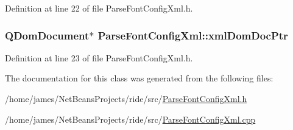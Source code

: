 Definition at line 22 of file Parse\-Font\-Config\-Xml.\-h.

\hypertarget{class_parse_font_config_xml_ac1f584710fc22d628bdca0e71308bffe}{
\subsubsection[{xml\-Dom\-Doc\-Ptr}]{\setlength{\rightskip}{0pt plus 5cm}Q\-Dom\-Document$\ast$ Parse\-Font\-Config\-Xml\-::xml\-Dom\-Doc\-Ptr\hspace{0.3cm}{\ttfamily [private]}}}\label{class_parse_font_config_xml_ac1f584710fc22d628bdca0e71308bffe}


Definition at line 23 of file Parse\-Font\-Config\-Xml.\-h.



The documentation for this class was generated from the following files\-:\begin{DoxyCompactItemize}
\item 
/home/james/\-Net\-Beans\-Projects/ride/src/\hyperlink{_parse_font_config_xml_8h}{Parse\-Font\-Config\-Xml.\-h}\item 
/home/james/\-Net\-Beans\-Projects/ride/src/\hyperlink{_parse_font_config_xml_8cpp}{Parse\-Font\-Config\-Xml.\-cpp}\end{DoxyCompactItemize}
